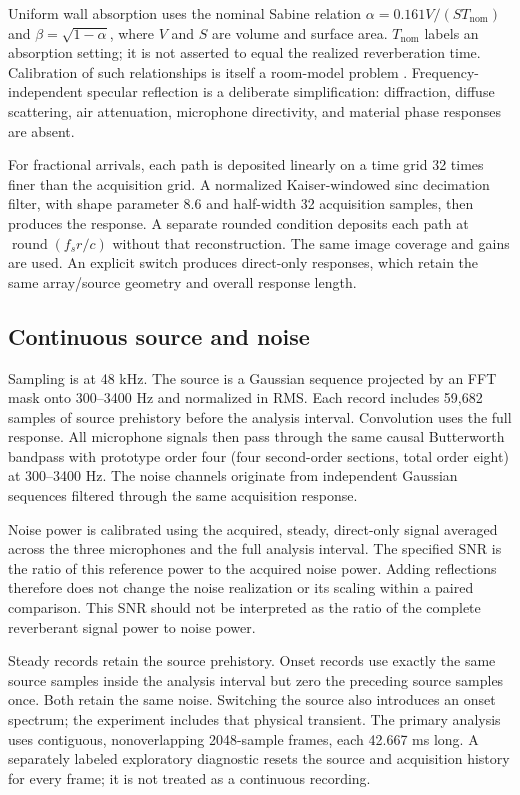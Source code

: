 \documentclass[10pt,a4paper,twocolumn]{article}
\begin{document}
Uniform wall absorption uses the nominal Sabine relation $\alpha=0.161V/(S T_{\mathrm{nom}})$ and $\beta=\sqrt{1-\alpha}$, where $V$ and $S$ are volume and surface area. $T_{\mathrm{nom}}$ labels an absorption setting; it is not asserted to equal the realized reverberation time. Calibration of such relationships is itself a room-model problem \citep{bellows}. Frequency-independent specular reflection is a deliberate simplification: diffraction, diffuse scattering, air attenuation, microphone directivity, and material phase responses are absent.

For fractional arrivals, each path is deposited linearly on a time grid 32 times finer than the acquisition grid. A normalized Kaiser-windowed sinc decimation filter, with shape parameter 8.6 and half-width 32 acquisition samples, then produces the response. A separate rounded condition deposits each path at $\operatorname{round}(f_s r/c)$ without that reconstruction. The same image coverage and gains are used. An explicit switch produces direct-only responses, which retain the same array/source geometry and overall response length.

\subsection{Continuous source and noise}
Sampling is at 48 kHz. The source is a Gaussian sequence projected by an FFT mask onto 300--3400 Hz and normalized in RMS. Each record includes 59,682 samples of source prehistory before the analysis interval. Convolution uses the full response. All microphone signals then pass through the same causal Butterworth bandpass with prototype order four (four second-order sections, total order eight) at 300--3400 Hz. The noise channels originate from independent Gaussian sequences filtered through the same acquisition response.

Noise power is calibrated using the acquired, steady, direct-only signal averaged across the three microphones and the full analysis interval. The specified SNR is the ratio of this reference power to the acquired noise power. Adding reflections therefore does not change the noise realization or its scaling within a paired comparison. This SNR should not be interpreted as the ratio of the complete reverberant signal power to noise power.

Steady records retain the source prehistory. Onset records use exactly the same source samples inside the analysis interval but zero the preceding source samples once. Both retain the same noise. Switching the source also introduces an onset spectrum; the experiment includes that physical transient. The primary analysis uses contiguous, nonoverlapping 2048-sample frames, each 42.667 ms long. A separately labeled exploratory diagnostic resets the source and acquisition history for every frame; it is not treated as a continuous recording.
\end{document}
